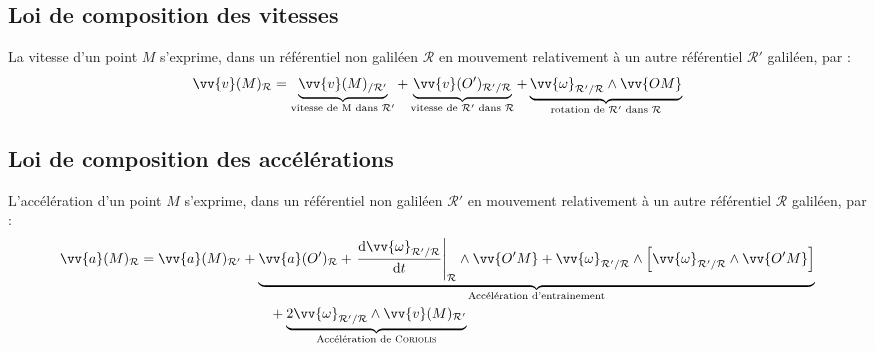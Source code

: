 \documentclass[11pt,a4paper,fleqn,pdftex]{report}
\begin{document}
\subsection{Loi de composition des vitesses}
\begin{theorem}
La vitesse d'un point $M$ s'exprime, dans un référentiel non galiléen $\mathcal{R}$ en mouvement relativement à un autre référentiel $\mathcal{R'}$ galiléen, par :
   \begin{equation}
   \vv{v}(M)_{\mathcal{R}} = \underbrace{\vv{v}(M)_{/\mathcal{R'}}}_{\text{vitesse de M dans }\mathcal{R'}}+\underbrace{\vv{v}(O')_{\mathcal{R'}/\mathcal{R}}}_{\text{vitesse de }\mathcal{R'}\text{ dans }\mathcal{R}} + \underbrace{\vv{\omega}_{\mathcal{R'}/\mathcal{R}}\wedge\vv{OM}}_{\text{rotation de }\mathcal{R'}\text{ dans }\mathcal{R}}
   \end{equation}
\end{theorem}
\subsection{Loi de composition des accélérations}
\begin{itheorem}
L'accélération d'un point $M$ s'exprime, dans un référentiel non galiléen $\mathcal{R'}$ en mouvement relativement à un autre référentiel $\mathcal{R}$ galiléen, par :
   \begin{equation}
   \begin{split}
   \vv{a}(M)_{\mathcal{R}} = 
          \vv{a}(M)_{\mathcal{R'}}
            &+ \underbrace{\vv{a}(O')_{\mathcal{R}} + \left. \dfrac{\d\vv{\omega}_{\mathcal{R'}/\mathcal{R}}}{\d t}\right|_{\mathcal{R}} \wedge \vv{O'M} + \vv{\omega}_{\mathcal{R'}/\mathcal{R}} \wedge \left[ \vv{\omega}_{\mathcal{R'}/\mathcal{R}} \wedge \vv{O'M} \right] }_{\text{Accélération d'entrainement}} \\
              &\qquad + \underbrace{2\vv{\omega}_{\mathcal{R'}/\mathcal{R}}\wedge \vv{v}(M)_\mathcal{R'}}_{\text{Accélération de \textsc{Coriolis}}}
   \end{split}
   \end{equation}
\end{itheorem}
\end{document}
